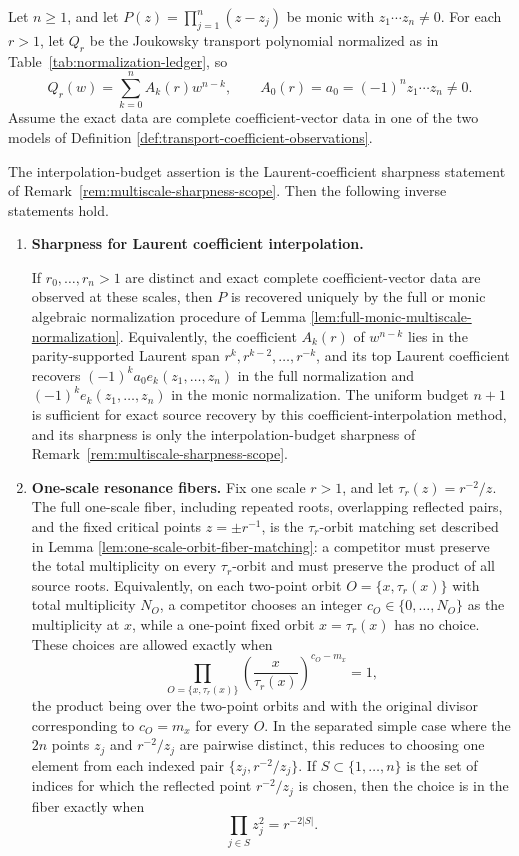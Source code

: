 \begin{theorem}\label{thm:algebraic-mahler-transport-inverse}
Let \(n\ge1\), and let \(P(z)=\prod_{j=1}^{n}(z-z_j)\) be monic with \(z_1\cdots z_n\ne0\).  For each \(r>1\), let \(Q_r\) be the Joukowsky transport polynomial normalized as in Table~\ref{tab:normalization-ledger}, so
\[
Q_r(w)=\sum_{k=0}^{n}A_k(r)w^{n-k},
\qquad
A_0(r)=a_0=(-1)^n z_1\cdots z_n\ne0.
\]
Assume the exact data are complete coefficient-vector data in one of the
two models of Definition \ref{def:transport-coefficient-observations}.

The interpolation-budget assertion is the Laurent-coefficient sharpness
statement of Remark~\ref{rem:multiscale-sharpness-scope}.  Then the
following inverse statements hold.
\begin{enumerate}[label=\textup{(\roman*)}]
  \item \leavevmode\par\noindent\textbf{Sharpness for Laurent coefficient interpolation.}

  If \(r_0,\dots,r_n>1\) are distinct and exact complete coefficient-vector data are observed at these scales, then \(P\) is recovered uniquely by the full or monic algebraic normalization procedure of Lemma \ref{lem:full-monic-multiscale-normalization}.  Equivalently, the coefficient \(A_k(r)\) of \(w^{n-k}\) lies in the parity-supported Laurent span \(r^k,r^{k-2},\dots,r^{-k}\), and its top Laurent coefficient recovers \((-1)^ka_0e_k(z_1,\dots,z_n)\) in the full normalization and \((-1)^ke_k(z_1,\dots,z_n)\) in the monic normalization.  The uniform budget \(n+1\) is sufficient for exact source recovery by this coefficient-interpolation method, and its sharpness is only the interpolation-budget sharpness of Remark~\ref{rem:multiscale-sharpness-scope}.

  \item \textbf{One-scale resonance fibers.}  Fix one scale \(r>1\), and let \(\tau_r(z)=r^{-2}/z\).  The full one-scale fiber, including repeated roots, overlapping reflected pairs, and the fixed critical points \(z=\pm r^{-1}\), is the \(\tau_r\)-orbit matching set described in Lemma \ref{lem:one-scale-orbit-fiber-matching}: a competitor must preserve the total multiplicity on every \(\tau_r\)-orbit and must preserve the product of all source roots.  Equivalently, on each two-point orbit \(O=\{x,\tau_r(x)\}\) with total multiplicity \(N_O\), a competitor chooses an integer \(c_O\in\{0,\dots,N_O\}\) as the multiplicity at \(x\), while a one-point fixed orbit \(x=\tau_r(x)\) has no choice.  These choices are allowed exactly when
  \[
  \prod_{O=\{x,\tau_r(x)\}}
  \left(\frac{x}{\tau_r(x)}\right)^{c_O-m_x}=1,
  \]
  the product being over the two-point orbits and with the original divisor corresponding to \(c_O=m_x\) for every \(O\).  In the separated simple case where the \(2n\) points \(z_j\) and \(r^{-2}/z_j\) are pairwise distinct, this reduces to choosing one element from each indexed pair \(\{z_j,r^{-2}/z_j\}\).  If \(S\subset\{1,\dots,n\}\) is the set of indices for which the reflected point \(r^{-2}/z_j\) is chosen, then the choice is in the fiber exactly when
  \[
  \prod_{j\in S}z_j^2=r^{-2|S|}.
  \]


\end{enumerate}
\end{theorem}

